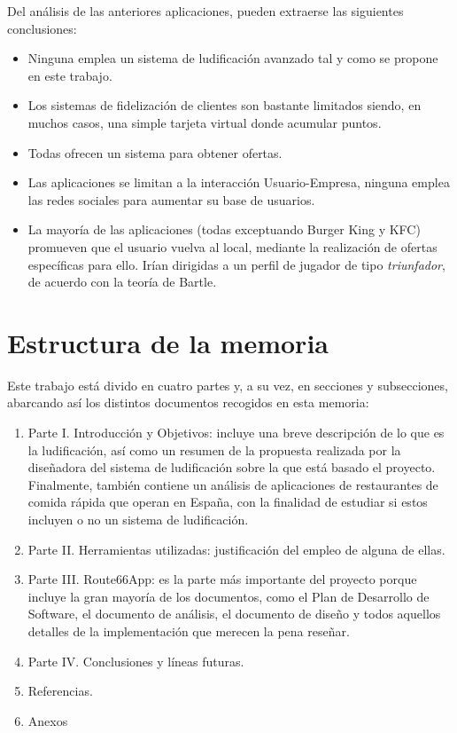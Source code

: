 \documentclass[twoside]{report}
\begin{document}
Del análisis de las anteriores aplicaciones, pueden extraerse las siguientes conclusiones:
\begin{itemize}

\item Ninguna emplea un sistema de ludificación avanzado tal y como se propone en este trabajo.

\item Los sistemas de fidelización de clientes son bastante limitados siendo, en muchos casos, una simple tarjeta virtual donde acumular puntos.

\item Todas ofrecen un sistema para obtener ofertas.

\item Las aplicaciones se limitan a la interacción Usuario-Empresa, ninguna emplea las redes sociales para aumentar su base de usuarios.

\item La mayoría de las aplicaciones (todas exceptuando Burger King y KFC) promueven que el usuario vuelva al local, mediante la realización de ofertas específicas para ello. Irían dirigidas a un perfil de jugador de tipo \textit{triunfador}, de acuerdo con la \cite{iebsctj} teoría de Bartle.
\end{itemize}

\section{Estructura de la memoria}

Este trabajo está divido en cuatro partes y, a su vez, en secciones y subsecciones, abarcando así los distintos documentos recogidos en esta memoria:

\begin{enumerate}
\item Parte I. Introducción y Objetivos: incluye una breve descripción de lo que es la ludificación, así como un resumen de la propuesta realizada por la diseñadora del sistema de ludificación sobre la que está basado el proyecto. Finalmente, también contiene un análisis de aplicaciones de restaurantes de comida rápida que operan en España, con la finalidad de estudiar si estos incluyen o no un sistema de ludificación.

\item Parte II. Herramientas utilizadas: justificación del empleo de alguna de ellas. 

\item Parte III. Route66App: es la parte más importante del proyecto porque incluye la gran mayoría de los documentos, como el Plan de Desarrollo de Software, el documento de análisis, el documento de diseño y todos aquellos detalles de la implementación que merecen la pena reseñar.

\item Parte IV. Conclusiones y líneas futuras.

\item Referencias.

\item Anexos

\end{enumerate}
\end{document}
